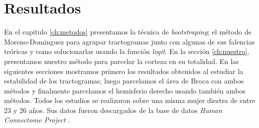 \chapter{Resultados}
\label{ch:resultados}

En el capitulo \ref{ch:metodos} presentamos la t\'ecnica de 
\textit{bootstraping}; el m\'etodo de Moreno-Dominguez para agrupar
tractogramas junto con algunas de sus falencias te\'oricas y como
solucionarlas usando la funci\'on \textit{logit}. En la secci\'on 
\ref{ch:nuestro}, presentamos nuestro m\'etodo para parcelar la corteza en
su totalidad. En las siguientes secciones mostramos primero los resultados
obtenidos al estudiar la estabilidad de los tractogramas; luego parcelamos
el \'area de Broca con ambos m\'etodos y finalmente parcelamos el
hemisferio derecho usando tambi\'en ambos m\'etodos. Todos los estudios se
realizaron sobre una misma mujer diestra de entre 23 y 26 a\~nos. Sus datos
fueron descargados de la base de datos \textit{Human Connectome Project}
\cite{VanEssen2012}. \\







